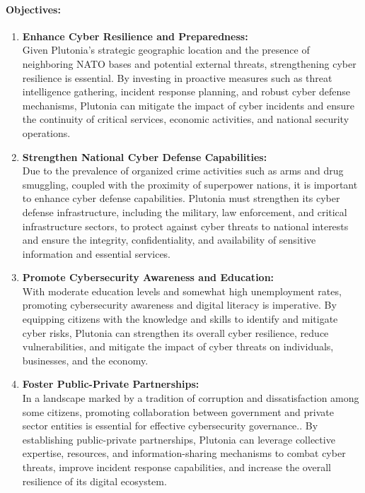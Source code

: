 \documentclass[
	a4paper, %
	10pt, %
]{CSSullivanBusinessReport}
\begin{document}
\begin{fullwidth}
\begin{justify}
\paragraph{Objectives:}
\begin{enumerate}
	\item \textbf{Enhance Cyber Resilience and Preparedness:} \\Given Plutonia's strategic geographic location and the presence of neighboring NATO bases and potential external threats, strengthening cyber resilience is essential. By investing in proactive measures such as threat intelligence gathering, incident response planning, and robust cyber defense mechanisms, Plutonia can mitigate the impact of cyber incidents and ensure the continuity of critical services, economic activities, and national security operations.
	\item \textbf{Strengthen National Cyber Defense Capabilities:} \\Due to the prevalence of organized crime activities such as arms and drug smuggling, coupled with the proximity of superpower nations, it is important to enhance cyber defense capabilities. Plutonia must strengthen its cyber defense infrastructure, including the military, law enforcement, and critical infrastructure sectors, to protect against cyber threats to national interests and ensure the integrity, confidentiality, and availability of sensitive information and essential services. 
	\item \textbf{Promote Cybersecurity Awareness and Education:} \\With moderate education levels and somewhat high unemployment rates, promoting cybersecurity awareness and digital literacy is imperative. By equipping citizens with the knowledge and skills to identify and mitigate cyber risks, Plutonia can strengthen its overall cyber resilience, reduce vulnerabilities, and mitigate the impact of cyber threats on individuals, businesses, and the economy.
	\item \textbf{Foster Public-Private Partnerships:} \\In a landscape marked by a tradition of corruption and dissatisfaction among some citizens, promoting collaboration between government and private sector entities is essential for effective cybersecurity governance.. By establishing public-private partnerships, Plutonia can leverage collective expertise, resources, and information-sharing mechanisms to combat cyber threats, improve incident response capabilities, and increase the overall resilience of its digital ecosystem.

\end{enumerate}
\end{justify}
\end{fullwidth}
\end{document}

